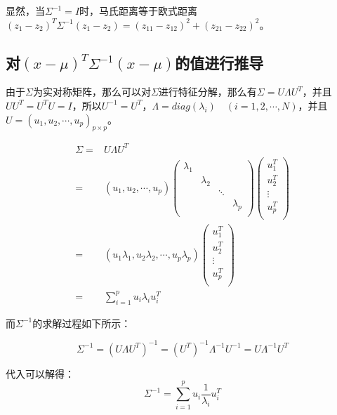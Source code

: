\documentclass[a4paper]{article}
\numberwithin{equation}{section}
\begin{document}
显然，当$\Sigma^{-1}=I$时，马氏距离等于欧式距离$ (z_1-z_2)^T\Sigma^{-1}(z_1-z_2)=(z_{11}-z_{12})^2+(z_{21}-z_{22})^2$。

\subsection{对$(x-\mu)^T\Sigma^{-1}(x-\mu)$的值进行推导}
由于$\Sigma$为实对称矩阵，那么可以对$\Sigma$进行特征分解，那么有$\Sigma = U\Lambda U^T$，并且$UU^T=U^TU=I$，所以$U^{-1}=U^T$，$\Lambda=diag(\lambda_i)\quad(i=1,2,\cdots,N)$，并且$U=(u_1,u_2,\cdots,u_p)_{p\times p}$。

\begin{align}
    \Sigma = & U\Lambda U^T \\
    = & (u_1,u_2,\cdots,u_p)
    \begin{pmatrix}
        \lambda_1 & & & \\
        & \lambda_2 & & \\
        & & \ddots & \\
        & & & \lambda_p \\
    \end{pmatrix}
    \begin{pmatrix}
        u_1^T  \\
        u_2^T  \\
        \vdots \\
        u_p^T  \\
    \end{pmatrix} \\
     = & (u_1\lambda_1,u_2\lambda_2,\cdots,u_p\lambda_p)
     \begin{pmatrix}
        u_1^T  \\
        u_2^T  \\
        \vdots \\
        u_p^T  \\
    \end{pmatrix} \\
    = & \sum_{i=1}^{p}u_i\lambda_i u_i^T
\end{align}

而$\Sigma^{-1}$的求解过程如下所示：

\begin{equation}
    \Sigma^{-1} = (U \Lambda U^T)^{-1} = (U^T)^{-1} \Lambda^{-1} U^{-1} = U \Lambda^{-1} U^T
\end{equation}

代入可以解得：
\begin{equation}
    \Sigma^{-1} = \sum_{i=1}^{p}u_i\frac{1}{\lambda_i} u_i^T
\end{equation}
\end{document}
